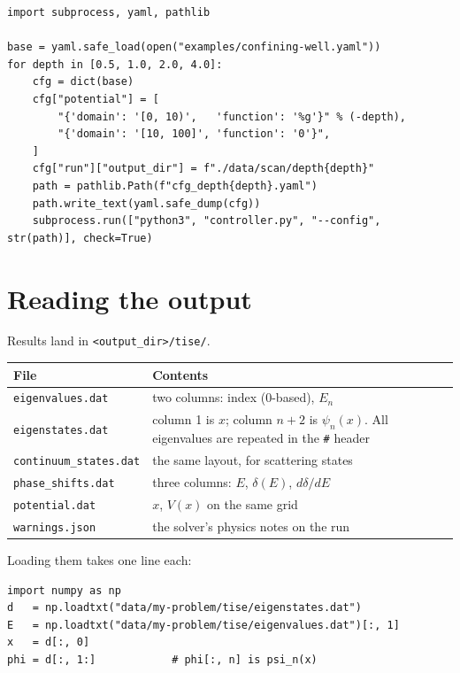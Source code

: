\documentclass[11pt]{article}
\newcommand{\file}[1]{\texttt{#1}}
\begin{document}
\begin{lstlisting}[style=py]
import subprocess, yaml, pathlib

base = yaml.safe_load(open("examples/confining-well.yaml"))
for depth in [0.5, 1.0, 2.0, 4.0]:
    cfg = dict(base)
    cfg["potential"] = [
        "{'domain': '[0, 10)',   'function': '%g'}" % (-depth),
        "{'domain': '[10, 100]', 'function': '0'}",
    ]
    cfg["run"]["output_dir"] = f"./data/scan/depth{depth}"
    path = pathlib.Path(f"cfg_depth{depth}.yaml")
    path.write_text(yaml.safe_dump(cfg))
    subprocess.run(["python3", "controller.py", "--config", str(path)], check=True)
\end{lstlisting}

\section{Reading the output}
\label{sec:output}

Results land in \file{<output\_dir>/tise/}.

\begin{center}
\begin{tabular}{@{}lp{}@{}}
\toprule
File & Contents \\
\midrule
\file{eigenvalues.dat}     & two columns: index (0-based), $E_n$ \\
\file{eigenstates.dat}     & column 1 is $x$; column $n{+}2$ is $\psi_n(x)$. All
                             eigenvalues are repeated in the \texttt{\#} header \\
\file{continuum\_states.dat} & the same layout, for scattering states \\
\file{phase\_shifts.dat}   & three columns: $E$, $\delta(E)$, $d\delta/dE$ \\
\file{potential.dat}       & $x$, $V(x)$ on the same grid \\
\file{warnings.json}       & the solver's physics notes on the run \\
\bottomrule
\end{tabular}
\end{center}

Loading them takes one line each:
\begin{lstlisting}[style=py]
import numpy as np
d   = np.loadtxt("data/my-problem/tise/eigenstates.dat")
E   = np.loadtxt("data/my-problem/tise/eigenvalues.dat")[:, 1]
x   = d[:, 0]
phi = d[:, 1:]            # phi[:, n] is psi_n(x)
\end{lstlisting}
\end{document}
